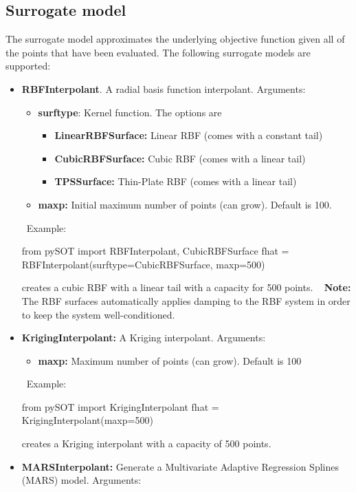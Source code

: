 \documentclass[]{article}
\begin{document}
\subsection{Surrogate model} 
\label{surrogate}
The surrogate model approximates the underlying objective function given all of the points that have been evaluated. The following surrogate models are supported:
\begin{itemize}
\item \textbf{RBFInterpolant}. A radial basis function interpolant. Arguments:
\begin{itemize}
\item \textbf{surftype}: Kernel function. The options are 
\begin{itemize}
\item \textbf{LinearRBFSurface:} Linear RBF (comes with a constant tail)
\item \textbf{CubicRBFSurface:} Cubic RBF (comes with a linear tail)
\item \textbf{TPSSurface:} Thin-Plate RBF (comes with a linear tail)
\end{itemize}
\item \textbf{maxp:} Initial maximum number of points (can grow). Default is 100.
\end{itemize}
\ \newline Example:
\begin{python}
from pySOT import RBFInterpolant, CubicRBFSurface
fhat = RBFInterpolant(surftype=CubicRBFSurface, maxp=500)
\end{python}
creates a cubic RBF with a linear tail with a capacity for 500 points.  \newline \ \newline
\textbf{Note:} The RBF surfaces automatically applies damping to the RBF system in order to keep the system well-conditioned. 
\item \textbf{KrigingInterpolant:} A Kriging interpolant. Arguments:
\begin{itemize}
\item \textbf{maxp:} Maximum number of points (can grow). Default is 100
\end{itemize}
\ \newline Example:
\begin{python}
from pySOT import KrigingInterpolant
fhat = KrigingInterpolant(maxp=500)
\end{python}
creates a Kriging interpolant with a capacity of 500 points.
\item \textbf{MARSInterpolant:} Generate a Multivariate Adaptive Regression Splines (MARS) model. Arguments:

\end{itemize}
\end{document}

